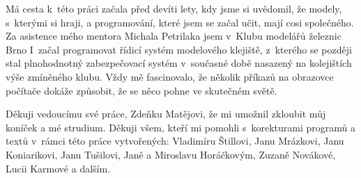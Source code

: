 Má cesta k~této práci začala před devíti lety, kdy jsme si uvědomil, že modely,
s~kterými si hraji, a programování, které jsem se začal učit, mají cosi
společného. Za asistence mého mentora Michala Petrilaka jsem v~Klubu modelářů
železnic Brno I~začal programovat řídicí systém modelového klejiště, z~kterého
se později stal plnohodnotný zabezpečovací systém v~současné době nasazený na
kolejištích výše zmíněného klubu. Vždy mě fascinovalo, že několik příkazů na
obrazovce počítače dokáže způsobit, že se něco pohne ve skutečném světě.

Děkuji vedoucímu své práce, Zdeňku Matějovi, že mi umožnil zkloubit můj koníček
a mé strudium. Děkuji všem, kteří mi pomohli s~korekturami programů a textů
v~rámci této práce vytvořených: Vladimíru Štillovi, Janu Mrázkovi, Janu
Koniarikovi, Janu Tušilovi, Janě a Miroslavu Horáčkovým, Zuzaně Novákové,
Lucii Karmové a dalším.
